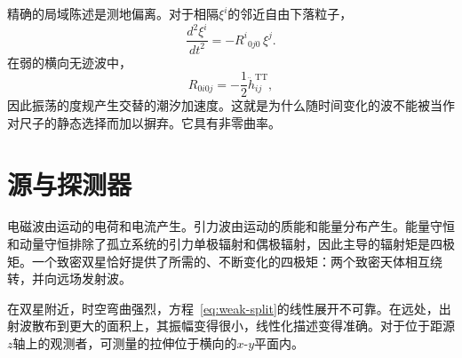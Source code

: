 \begin{classroomqa}
\end{classroomqa}

精确的局域陈述是测地偏离。对于相隔\(\xi^i\)的邻近自由下落粒子，
\begin{equation}
 \frac{d^2\xi^i}{dt^2}
 =-R^i{}_{0j0}\,\xi^j.
 \label{eq:geodesic-deviation}
\end{equation}
在弱的横向无迹波中，
\begin{equation}
 R_{0i0j}=-\frac12\ddot h^{\mathrm{TT}}_{ij},
 \label{eq:tidal-curvature}
\end{equation}
因此振荡的度规产生交替的潮汐加速度。这就是为什么随时间变化的波不能被当作对尺子的静态选择而加以摒弃。它具有非零曲率。

\begin{classroomqa}
\end{classroomqa}

\section{源与探测器}

电磁波由运动的电荷和电流产生。引力波由运动的质能和能量分布产生。能量守恒和动量守恒排除了孤立系统的引力单极辐射和偶极辐射，因此主导的辐射矩是四极矩。一个致密双星恰好提供了所需的、不断变化的四极矩：两个致密天体相互绕转，并向远场发射波。

在双星附近，时空弯曲强烈，方程~\eqref{eq:weak-split}的线性展开不可靠。在远处，出射波散布到更大的面积上，其振幅变得很小，线性化描述变得准确。对于位于距源\(z\)轴上的观测者，可测量的拉伸位于横向的\(x\)-\(y\)平面内。

\begin{classroomqa}
\end{classroomqa}

